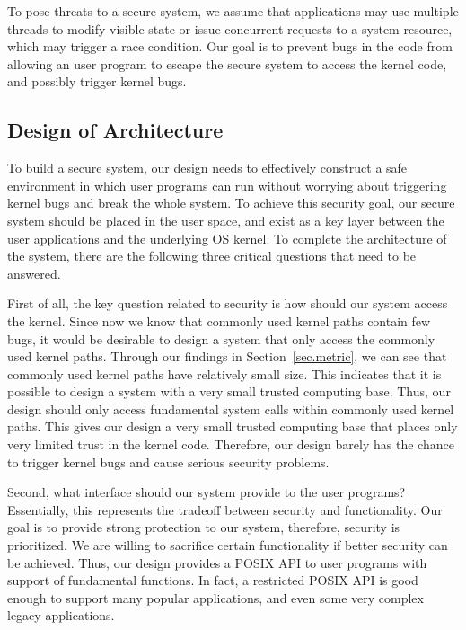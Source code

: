 To pose threats to a secure system, we assume that applications may use multiple threads to modify visible 
state or issue concurrent requests to a system resource, which may trigger a race condition. Our goal is to prevent bugs in 
the code from allowing an user program to escape the secure system to access the kernel code, and 
possibly trigger kernel bugs.

\subsection{Design of Architecture}
To build a secure system, our design needs to effectively construct a safe environment in which user programs 
can run without worrying about triggering kernel bugs and break the whole system. 
To achieve this security goal, 
our secure system should be placed in the user space, and exist as a key layer between the user applications 
and the underlying OS kernel. To complete the architecture of the system, there are the following three critical 
questions that need to be answered. 

First of all, the key question related to security is how should our system access the kernel. Since now we know 
that commonly used kernel paths contain few bugs, it would be desirable to design a system that only access the 
commonly used kernel paths. Through our findings in Section~\ref{sec.metric}, we can see that commonly used kernel paths have relatively 
small size. This indicates that it is possible to design a system with a very small 
trusted computing base. Thus, our design should only access fundamental system calls within commonly used kernel paths. 
This gives our design a very small trusted computing base that places only very limited trust in the kernel code. Therefore, 
our design barely has the chance to trigger kernel bugs and cause serious security problems. 

Second, what interface should our system provide to the user programs? Essentially, this represents the tradeoff between 
security and functionality. Our goal is to provide strong protection to our system, therefore, security is prioritized. We are willing 
to sacrifice certain functionality if better security can be achieved. Thus, our design provides a POSIX API to user programs with 
support of fundamental functions. In fact, a restricted POSIX API is good enough to support many popular applications, 
and even some very complex legacy applications. 

